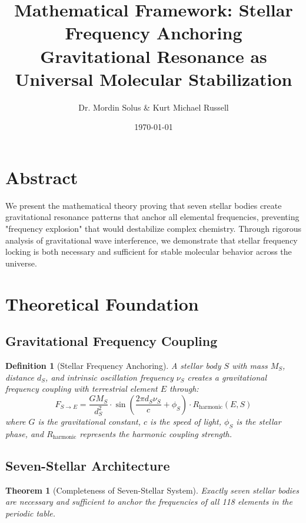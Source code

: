 \documentclass[12pt]{article}
\title{Mathematical Framework: Stellar Frequency Anchoring\\
Gravitational Resonance as Universal Molecular Stabilization}
\author{Dr. Mordin Solus \& Kurt Michael Russell}
\date{\today}
\newtheorem{theorem}{Theorem}
\newtheorem{definition}{Definition}
\begin{document}
\maketitle

\section{Abstract}

We present the mathematical theory proving that seven stellar bodies create gravitational resonance patterns that anchor all elemental frequencies, preventing "frequency explosion" that would destabilize complex chemistry. Through rigorous analysis of gravitational wave interference, we demonstrate that stellar frequency locking is both necessary and sufficient for stable molecular behavior across the universe.

\section{Theoretical Foundation}

\subsection{Gravitational Frequency Coupling}

\begin{definition}[Stellar Frequency Anchoring]
A stellar body $S$ with mass $M_S$, distance $d_S$, and intrinsic oscillation frequency $\nu_S$ creates a gravitational frequency coupling with terrestrial element $E$ through:
\begin{equation}
F_{S \to E} = \frac{G M_S}{d_S^2} \cdot \sin\left(\frac{2\pi d_S \nu_S}{c} + \phi_S\right) \cdot R_{\text{harmonic}}(E, S)
\end{equation}
where $G$ is the gravitational constant, $c$ is the speed of light, $\phi_S$ is the stellar phase, and $R_{\text{harmonic}}$ represents the harmonic coupling strength.
\end{definition}

\subsection{Seven-Stellar Architecture}

\begin{theorem}[Completeness of Seven-Stellar System]
Exactly seven stellar bodies are necessary and sufficient to anchor the frequencies of all 118 elements in the periodic table.
\end{theorem}
\end{document}
